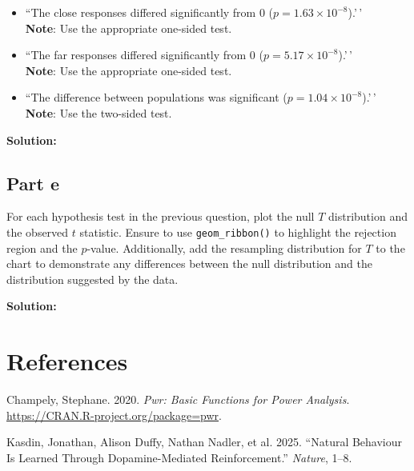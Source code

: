 \documentclass[
]{article}
\newlength{\cslhangindent}
\newenvironment{CSLReferences}[2] %
 {\begin{list}{}{%
  \setlength{\itemindent}{0pt}
  \setlength{\leftmargin}{0pt}
  \setlength{\parsep}{0pt}
  \ifodd #1
   \setlength{\leftmargin}{\cslhangindent}
   \setlength{\itemindent}{-1\cslhangindent}
  \fi
  \setlength{\itemsep}{#2\baselineskip}}}
 {\end{list}}
\providecommand{\tightlist}{%
  \setlength{\itemsep}{0pt}\setlength{\parskip}{0pt}}
\begin{document}
\begin{itemize}
\tightlist
\item
  ``The close responses differed significantly from 0
  (\(p=1.63 \times 10^{-8}\)).'\,'\\
  \textbf{Note}: Use the appropriate one-sided test.
\item
  ``The far responses differed significantly from 0
  (\(p=5.17 \times 10^{-8}\)).'\,'\\
  \textbf{Note}: Use the appropriate one-sided test.
\item
  ``The difference between populations was significant
  (\(p=1.04 \times10^{-8}\)).'\,'\\
  \textbf{Note}: Use the two-sided test.
\end{itemize}

\textbf{Solution:}

\normalsize

\normalsize

\subsection{Part e}\label{part-e}

For each hypothesis test in the previous question, plot the null \(T\)
distribution and the observed \(t\) statistic. Ensure to use
\texttt{geom\_ribbon()} to highlight the rejection region and the
\(p\)-value. Additionally, add the resampling distribution for \(T\) to
the chart to demonstrate any differences between the null distribution
and the distribution suggested by the data.

\textbf{Solution:}

\normalsize

\normalsize

\section*{References}\label{bibliography}

\protect{}\label{refs}
\begin{CSLReferences}{1}{1}
Champely, Stephane. 2020. \emph{Pwr: {B}asic Functions for Power
Analysis}. \url{https://CRAN.R-project.org/package=pwr}.

Kasdin, Jonathan, Alison Duffy, Nathan Nadler, et al. 2025. {``Natural
Behaviour Is Learned Through Dopamine-Mediated Reinforcement.''}
\emph{Nature}, 1--8.

\end{CSLReferences}
\end{document}
